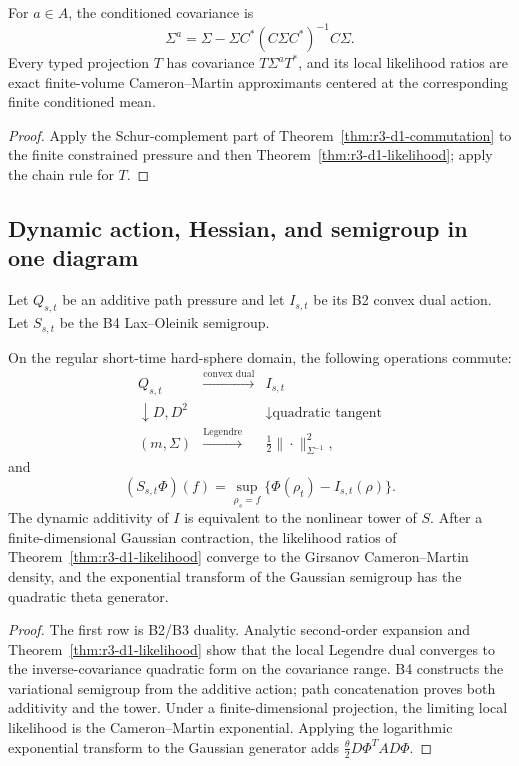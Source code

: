 \begin{corollary}
\label{cor:r3-d1-conditioned}
For \(a\in A\), the conditioned covariance is
\[
 \Sigma^a
 =\Sigma-\Sigma C^*(C\Sigma C^*)^{-1}C\Sigma.
\]
Every typed projection \(T\) has covariance \(T\Sigma^aT^*\), and its local
likelihood ratios are exact finite-volume Cameron--Martin approximants centered
at the corresponding finite conditioned mean.
\end{corollary}

\begin{proof}
Apply the Schur-complement part of
Theorem~\ref{thm:r3-d1-commutation} to the finite constrained pressure and then
Theorem~\ref{thm:r3-d1-likelihood}; apply the chain rule for \(T\).
\end{proof}

\subsection{Dynamic action, Hessian, and semigroup in one diagram}

Let \(Q_{s,t}\) be an additive path pressure and let \(I_{s,t}\) be its B2
convex dual action.  Let \(S_{s,t}\) be the B4 Lax--Oleinik semigroup.

\begin{theorem}
\label{thm:r3-d1-triangle}
On the regular short-time hard-sphere domain, the following operations
commute:
\[
 \begin{array}{ccc}
 Q_{s,t} & \xrightarrow{\text{convex dual}} & I_{s,t}\\
 \downarrow D,D^2 && \downarrow\text{quadratic tangent}\\
 (m,\Sigma) & \xrightarrow{\text{Legendre}} &
 \tfrac12\|\cdot\|_{\Sigma^{-1}}^2,
 \end{array}
\]
and
\[
 (S_{s,t}\Phi)(f)
 =\sup_{\rho_s=f}
 \{\Phi(\rho_t)-I_{s,t}(\rho)\}.
\]
The dynamic additivity of \(I\) is equivalent to the nonlinear tower of
\(S\).  After a finite-dimensional Gaussian contraction, the likelihood
ratios of Theorem~\ref{thm:r3-d1-likelihood} converge to the Girsanov
Cameron--Martin density, and the exponential transform of the Gaussian
semigroup has the quadratic theta generator.
\end{theorem}

\begin{proof}
The first row is B2/B3 duality.  Analytic second-order expansion and
Theorem~\ref{thm:r3-d1-likelihood} show that the local Legendre dual converges
to the inverse-covariance quadratic form on the covariance range.  B4
constructs the variational semigroup from the additive action; path
concatenation proves both additivity and the tower.  Under a finite-dimensional
projection, the limiting local likelihood is the Cameron--Martin exponential.
Applying the logarithmic exponential transform to the Gaussian generator adds
\(\frac\theta2D\Phi^TAD\Phi\).
\end{proof}

